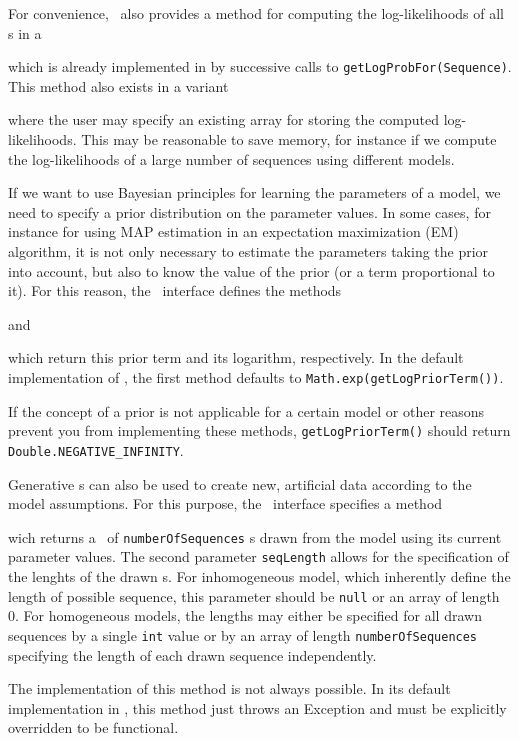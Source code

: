 For convenience, \TrainSM~also provides a method for computing the log-likelihoods of all \Sequence s in a \DataSet
\addtocounter{off}{25}
which is already implemented in \AbstractTrainSM by successive calls to \lstinline+getLogProbFor(Sequence)+. This method also exists in a variant
\addtocounter{off}{25}
where the user may specify an existing array for storing the computed log-likelihoods. This may be reasonable to save memory, for instance if we compute the log-likelihoods of a large number of sequences using different models.

If we want to use Bayesian principles for learning the parameters of a model, we need to specify a prior distribution on the parameter values. In some cases, for instance for using MAP estimation in an expectation maximization (EM) algorithm, it is not only necessary to estimate the parameters taking the prior into account, but also to know the value of the prior (or a term proportional to it). For this reason, the \TrainSM~interface defines the methods
\addtocounter{off}{11}
and
\addtocounter{off}{13}
which return this prior term and its logarithm, respectively. In the default implementation of \AbstractTrainSM, the first method defaults to \lstinline+Math.exp(getLogPriorTerm())+.

If the concept of a prior is not applicable for a certain model or other reasons prevent you from implementing these methods, \lstinline+getLogPriorTerm()+ should return \lstinline+Double.NEGATIVE_INFINITY+.

Generative \TrainSM s can also be used to create new, artificial data according to the model assumptions. For this purpose, the \TrainSM~interface specifies a method
\addtocounter{off}{50}
wich returns a \DataSet~of \lstinline+numberOfSequences+ \Sequence s drawn from the model using its current parameter values. The second parameter \lstinline+seqLength+ allows for the specification of the lenghts of the drawn \Sequence s. For inhomogeneous model, which inherently define the length of possible sequence, this parameter should be \lstinline+null+ or an array of length 0. For homogeneous models, the lengths may either be specified for all drawn sequences by a single \lstinline+int+ value or by an array of length \lstinline+numberOfSequences+ specifying the length of each drawn sequence independently.

The implementation of this method is not always possible. In its default implementation in \AbstractTrainSM, this method just throws an Exception and must be explicitly overridden to be functional.

